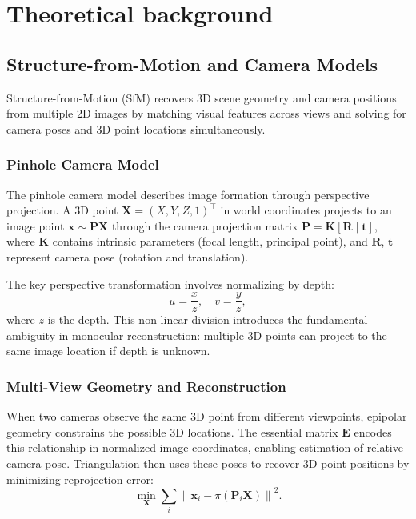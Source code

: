 \chapter{Theoretical background}

\section{Structure-from-Motion and Camera Models}
\label{sec:sfm}

Structure-from-Motion (SfM) recovers 3D scene geometry and camera positions from multiple 2D images by matching visual features across views and solving for camera poses and 3D point locations simultaneously.

\subsection{Pinhole Camera Model}

The pinhole camera model describes image formation through perspective projection. A 3D point $\mathbf{X} = (X, Y, Z, 1)^\top$ in world coordinates projects to an image point $\mathbf{x} \sim \mathbf{P} \mathbf{X}$ through the camera projection matrix $\mathbf{P} = \mathbf{K} [\mathbf{R} \mid \mathbf{t}]$, where $\mathbf{K}$ contains intrinsic parameters (focal length, principal point), and $\mathbf{R}$, $\mathbf{t}$ represent camera pose (rotation and translation).

The key perspective transformation involves normalizing by depth:
\begin{equation}
u = \frac{x}{z}, \quad v = \frac{y}{z},
\end{equation}
where $z$ is the depth. This non-linear division introduces the fundamental ambiguity in monocular reconstruction: multiple 3D points can project to the same image location if depth is unknown.

\subsection{Multi-View Geometry and Reconstruction}

When two cameras observe the same 3D point from different viewpoints, epipolar geometry constrains the possible 3D locations. The essential matrix $\mathbf{E}$ encodes this relationship in normalized image coordinates, enabling estimation of relative camera pose. Triangulation then uses these poses to recover 3D point positions by minimizing reprojection error:
\begin{equation}
\min_{\mathbf{X}} \sum_i \left\| \mathbf{x}_i - \pi(\mathbf{P}_i \mathbf{X}) \right\|^2.
\end{equation}

